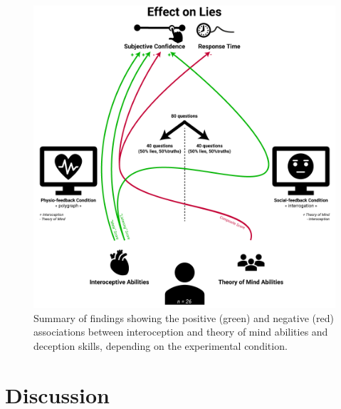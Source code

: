 \documentclass[
  man,floatsintext]{apa6}
\begin{document}
\begin{figure}
\includegraphics[width=1\linewidth]{../figures/figure2} \caption{Summary of findings showing the positive (green) and negative (red) associations between interoception and theory of mind abilities and deception skills, depending on the experimental condition.}\label{fig:unnamed-chunk-2}
\end{figure}

\hypertarget{discussion}{%
\section{Discussion}\label{discussion}}
\end{document}
